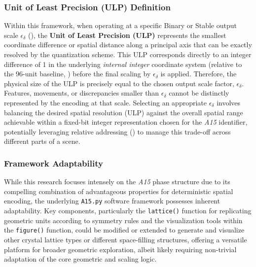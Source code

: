 \documentclass[10pt]{article}
\def\AAAB{\textit{A15}}
\begin{document}
\subsubsection{Unit of Least Precision (ULP) Definition}\label{subsubsec-notes-ulp}
Within this framework, when operating at a specific Binary or Stable output scale $\epsilon_\delta$ (), the \textbf{Unit of Least Precision (ULP)} represents the smallest coordinate difference or spatial distance along a principal axis that can be exactly resolved by the quantization scheme. This ULP corresponds directly to an integer difference of \num{1} in the underlying \emph{internal integer} coordinate system (relative to the 96-unit baseline, ) before the final scaling by $\epsilon_\delta$ is applied. Therefore, the physical size of the ULP is precisely equal to the chosen output scale factor, $\epsilon_\delta$. Features, movements, or discrepancies smaller than $\epsilon_\delta$ cannot be distinctly represented by the encoding at that scale. Selecting an appropriate $\epsilon_\delta$ involves balancing the desired spatial resolution (ULP) against the overall spatial range achievable within a fixed-bit integer representation chosen for the \AAAB{} identifier, potentially leveraging relative addressing () to manage this trade-off across different parts of a scene.

\subsubsection{Framework Adaptability}\label{subsubsec-notes-adaptability}
While this research focuses intensely on the \AAAB{} phase structure due to its compelling combination of advantageous properties for deterministic spatial encoding, the underlying \texttt{A15.py} software framework possesses inherent adaptability. Key components, particularly the \texttt{lattice()} function for replicating geometric units according to symmetry rules and the visualization tools within the \texttt{figure()} function, could be modified or extended to generate and visualize other crystal lattice types or different space-filling structures, offering a versatile platform for broader geometric exploration, albeit likely requiring non-trivial adaptation of the core geometric and scaling logic.
\end{document}
